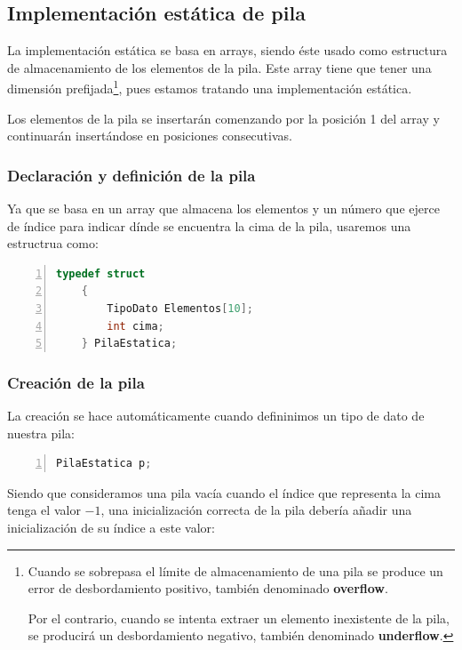 \documentclass[a4paper, 11pt, titlepage]{article}
\begin{document}
    \subsection{Implementación estática de pila}

        La implementación estática se basa en arrays, siendo éste usado como estructura de almacenamiento 
        de los elementos de la pila. Este array tiene que tener una dimensión prefijada\footnote{
            Cuando se sobrepasa el límite de almacenamiento de una pila se produce un error de 
            desbordamiento positivo, también denominado \textbf{overflow}.
            
            Por el contrario, cuando se intenta extraer un elemento inexistente de la pila, se producirá 
            un desbordamiento negativo, también denominado \textbf{underflow}.
        }, pues estamos 
        tratando una implementación estática.

        Los elementos de la pila se insertarán comenzando por la posición 1 del array y continuarán 
        insertándose en posiciones consecutivas. 

        \subsubsection{Declaración y definición de la pila}

            Ya que se basa en un array que almacena los elementos y un número que ejerce de índice 
            para indicar dínde se encuentra la cima de la pila, usaremos una estructrua como:

            \begin{lstlisting}[language=C,numbers=left]
    typedef struct 
    {
        TipoDato Elementos[10];
        int cima;
    } PilaEstatica; \end{lstlisting}

        \subsubsection{Creación de la pila}

            La creación se hace automáticamente cuando defininimos un tipo de dato de nuestra pila:

            \begin{lstlisting}[language=C,numbers=left]
    PilaEstatica p;\end{lstlisting}

            Siendo que consideramos una pila vacía cuando el índice que representa la cima tenga 
            el valor $-1$, una inicialización correcta de la pila debería añadir una inicialización 
            de su índice a este valor:
\end{document}
